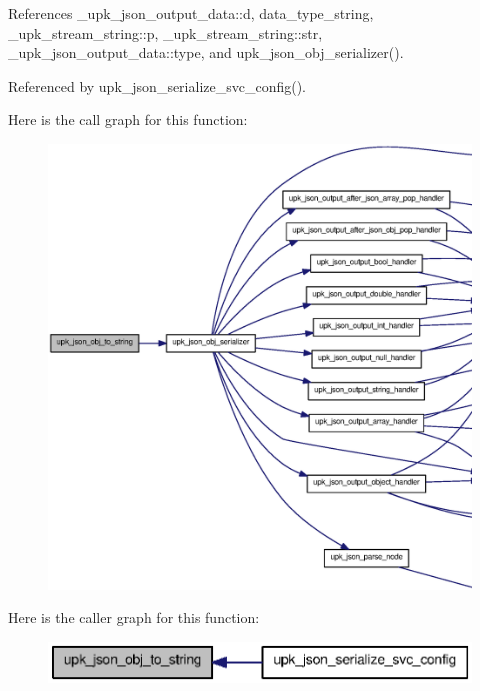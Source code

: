 References \_\-upk\_\-json\_\-output\_\-data::d, data\_\-type\_\-string, \_\-upk\_\-stream\_\-string::p, \_\-upk\_\-stream\_\-string::str, \_\-upk\_\-json\_\-output\_\-data::type, and upk\_\-json\_\-obj\_\-serializer().



Referenced by upk\_\-json\_\-serialize\_\-svc\_\-config().



Here is the call graph for this function:
\nopagebreak
\begin{figure}[H]
\begin{center}
\leavevmode
\includegraphics[width=400pt]{upk__json_8h_a40b01bf12283a69e42e025934ef029b0_cgraph}
\end{center}
\end{figure}




Here is the caller graph for this function:
\nopagebreak
\begin{figure}[H]
\begin{center}
\leavevmode
\includegraphics[width=346pt]{upk__json_8h_a40b01bf12283a69e42e025934ef029b0_icgraph}
\end{center}
\end{figure}


